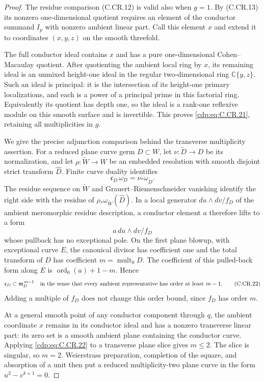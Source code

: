 \begin{proof}
The residue comparison (C.CR.12) is valid also
when $g=1$. By (C.CR.13) its nonzero one-dimensional
quotient requires an element of the conductor
summand $I_p$ with nonzero ambient linear part.
Call this element $x$ and extend it to coordinates
$(x,y,z)$ on the smooth threefold.

The full conductor ideal contains $x$ and has a
pure one-dimensional Cohen--Macaulay quotient.
After quotienting the ambient local ring by $x$,
its remaining ideal is an unmixed height-one
ideal in the regular two-dimensional ring
$\mathbb C\{y,z\}$. Such an ideal is principal:
it is the intersection of its height-one primary
localizations, and each is a power of a principal
prime in this factorial ring. Equivalently its
quotient has depth one, so the ideal is a rank-one
reflexive module on this smooth surface and
is invertible. This proves \eqref{cdp:eq:C.CR.21}, retaining
all multiplicities in $g$.

We give the precise adjunction comparison behind
the transverse multiplicity assertion. For a
reduced plane curve germ $D\subset W$, let
$\nu:\widetilde D\to D$ be its normalization,
and let $\rho:\widetilde W\to W$ be an embedded
resolution with smooth disjoint strict transform
$\widehat D$. Finite curve duality identifies
\[
 \mathfrak c_D\,\omega_D=\nu_*\omega_{\widetilde D}.
\]
The residue sequence on $\widetilde W$ and
Grauert--Riemenschneider vanishing identify the
right side with the residue of
$\rho_*\omega_{\widetilde W}(\widehat D)$.
In a local generator $du\wedge dv/f_D$ of the
ambient meromorphic residue description, a
conductor element $a$ therefore lifts to a form
\[
                     a\,du\wedge dv/f_D
\]
whose pullback has no exceptional pole. On the
first plane blowup, with exceptional curve $E$,
the canonical divisor has coefficient one and
the total transform of $D$ has coefficient
$m=\operatorname{mult}_0 D$. The coefficient
of this pulled-back form along $E$ is
$\operatorname{ord}_0(a)+1-m$. Hence
\[
 \mathfrak c_D\subset\mathfrak m_D^{\,m-1}
 \quad\hbox{in the sense that every ambient
 representative has order at least }m-1.
 \tag{C.CR.22}\label{cdp:eq:C.CR.22}
\]
Adding a multiple of $f_D$ does not change this
order bound, since $f_D$ has order $m$.

At a general smooth point of any conductor
component through $q$, the ambient coordinate
$x$ remains in its conductor ideal and has
a nonzero transverse linear part: its zero
set is a smooth ambient plane containing the
conductor curve. Applying \eqref{cdp:eq:C.CR.22} to a
transverse plane slice gives $m\le2$.
The slice is singular, so $m=2$.
Weierstrass preparation, completion of the
square, and absorption of a unit then put
a reduced multiplicity-two plane curve in
the form $u^2-v^{k+1}=0$.


\end{proof}
